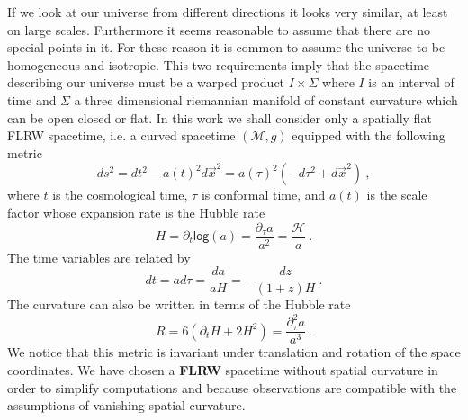 \documentclass[11pt]{book}
\renewcommand{\log}{\mathsf{log}}
\newcommand{\Hcal}{\mathcal{H}}
\newcommand{\Mcal}{\mathcal{M}}
\theoremstyle{break}
\begin{document}
If we look at our universe from different directions it looks very similar, at least on large scales. Furthermore it seems reasonable to assume that there are no special points in it. For these reason it is common to assume the universe to be homogeneous and isotropic. This two requirements imply that the spacetime describing our universe must be a warped product $I\times \Sigma$ where $I$ is an interval of time and $\Sigma$ a three dimensional riemannian manifold of constant curvature which can be open closed or flat. In this work we shall consider only a spatially flat FLRW spacetime, i.e. a curved spacetime $(\Mcal,g)$ equipped with the following metric
%
\begin{equation*}
ds^2 = dt^2 - a(t)^2 d\vec{x}^2 = a(\tau)^2\left(-d\tau^2+d\vec{x}^2\right) \ ,
\end{equation*}
%
where $t$ is the cosmological time, $\tau$ is conformal time, and $a(t)$ is the scale factor whose expansion rate is the Hubble rate
%
\begin{equation*}
H = \partial_t \log (a) = \frac{\partial_\tau a}{a^2} = \frac{\Hcal}{a} \ .
\end{equation*}
%
The time variables are related by
%
\begin{equation*}
dt = a d\tau = \frac{da}{aH} = -\frac{dz}{(1+z)H} \ . 
\end{equation*}
% 
The curvature can also be written in terms of the Hubble rate
%
\begin{equation}
R=6(\partial_t H + 2 H^2)=\frac{\partial^2_\tau a}{a^3} \ . 
\label{eq:rflrw}
\end{equation}
%
We notice that this metric is invariant under translation and rotation of the space coordinates. We have chosen a \textbf{FLRW} spacetime without spatial curvature in order to simplify computations and because observations are compatible with the assumptions of vanishing spatial curvature. 








\nocite{*}








\end{document}
